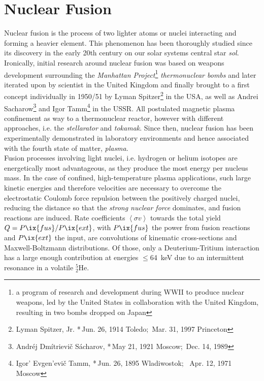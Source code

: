     \section{Nuclear Fusion}\label{sec:section}%
%
        Nuclear fusion is the process of two lighter atoms or nuclei interacting and forming a heavier element. This phenomenon has been thoroughly studied since its discovery in the early 20th century on our solar systems central star \textit{sol}\cite{Oliphant1934}. Ironically, initial research around nuclear fusion was based on weapons development surrounding the \textit{Manhattan Project}\footnote[1]{a program of research and development during WWII to produce nuclear weapons, led by the United States in collaboration with the United Kingdom, resulting in two bombs dropped on Japan} \textit{thermonuclear bombs} and later iterated upon by scientist in the United Kingdom and finally brought to a first concept individually in 1950/51 by Lyman Spitzer\footnote[2]{Lyman Spitzer, Jr. *\,Jun. 26, 1914 Toledo; \textdagger\,Mar. 31, 1997 Princeton} in the USA, as well as Andrei Sacharow\footnote[3]{Andréj Dmítrievič Sácharov, *\,May 21, 1921 Moscow; \textdagger\,Dec. 14, 1989} and Igor Tamm\footnote[4]{Igor' Evgen'evič Tamm, *\,Jun. 26, 1895 Wladiwostok; \textdagger\, Apr. 12, 1971 Moscow} in the USSR. All postulated magnetic plasma confinement as way to a thermonuclear reactor, however with different approaches, i.e. the \textit{stellarator} and \textit{tokamak}. Since then, nuclear fusion has been experimentally demonstrated in laboratory environments and hence associated with the fourth state of matter, \textit{plasma}\cite{Shafranov2001}.\\%
        Fusion processes involving light nuclei, i.e. hydrogen or helium isotopes are energetically most advantageous, as they produce the most energy per nucleus mass. In the case of confined, high-temperature plasma applications, such large kinetic energies and therefore velocities are necessary to overcome the electrostatic Coulomb force repulsion between the positively charged nuclei, reducing the distance so that the \textit{strong nuclear force} dominates, and fusion reactions are induced. Rate coefficients $\left\langle\sigma v\right\rangle$ towards the total yield $Q=P\ix{fus}/P\ix{ext}$, with $P\ix{fus}$ the power from fusion reactions and $P\ix{ext}$ the input, are convolutions of kinematic cross-sections and Maxwell-Boltzmann distributions. Of those, only a Deuterium-Tritium interaction has a large enough contribution at energies $\le$\SI{64}{\kilo\electronvolt} due to an intermittent resonance in a volatile $^{5}_{2}$He\cite{Bosch1992}.
